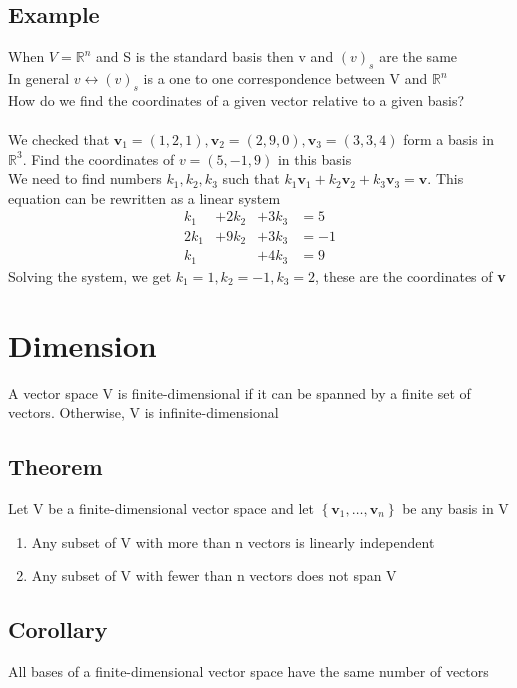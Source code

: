 \documentclass{article}[18pt]
\begin{document}
\subsection{Example}
When $V=\mathbb{ R }^n$ and S is the standard basis then v and $(v)_s$ are the same\\
In general $v\leftrightarrow (v)_s$ is a one to one correspondence between V and $\mathbb{ R }^n$\\
How do we find the coordinates of a given vector relative to a given basis?\\
\\
We checked that $\mathbf { v } _ { 1 } = ( 1,2,1 ) , \mathbf { v } _ { 2 } = ( 2,9,0 ) , \mathbf { v } _ { 3 } = ( 3,3,4 )$ form a basis in $\mathbb{ R }^3$. Find the coordinates of $v=(5,-1,9)$ in this basis\\
We need to find numbers $k_1,k_2,k_3$ such that $k _ { 1 } \mathbf { v } _ { 1 } + k _ { 2 } \mathbf { v } _ { 2 } + k _ { 3 } \mathbf { v } _ { 3 } = \mathbf { v }$. This equation can be rewritten as a linear system
$$\begin{aligned}
 k _ { 1 } &+ 2 k _ { 2 } & + 3 k _ { 3 } &= 5 \\ 
 2 k _ { 1 }& + 9 k _ { 2 } & + 3 k _ { 3 } &= - 1 \\
  k _ { 1 } & &+ 4 k _ { 3 } &= 9 \end{aligned}$$
 Solving the system, we get $k_1=1,k_2=-1,k_3=2$, these are the coordinates of \textbf{v}
 \section{Dimension}
 A vector space V is finite-dimensional if it can be spanned by a finite set of vectors. Otherwise, V is infinite-dimensional
 \subsection{Theorem}
 Let V be a finite-dimensional vector space and let $\left\{ \mathbf { v } _ { 1 } , \dots , \mathbf { v } _ { n } \right\}$ be any basis in V
 \begin{enumerate}
 	\item Any subset of V with more than n vectors is linearly independent
 	\item Any subset of V with fewer than n vectors does not span V
 \end{enumerate}
\subsection{Corollary}
All bases of a finite-dimensional vector space have the same number of vectors
\end{document}
